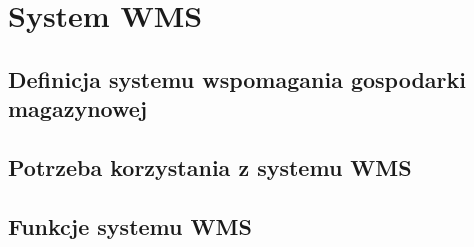 \chapter{System WMS}
\label{c5:c5}

\section{Definicja systemu wspomagania gospodarki magazynowej}
\section{Potrzeba korzystania z systemu WMS}
\section{Funkcje systemu WMS}
